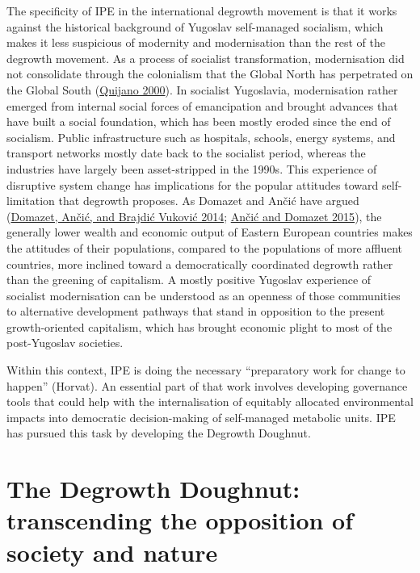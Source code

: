 \documentclass[a4paper, nobind]{templates/ociamthesis}
\begin{document}
The specificity of IPE in the international degrowth movement is that it works against the historical background of Yugoslav self-managed socialism, which makes it less suspicious of modernity and modernisation than the rest of the degrowth movement. As a process of socialist transformation, modernisation did not consolidate through the colonialism that the Global North has perpetrated on the Global South (\protect\hyperlink{ref-quijano_coloniality_2000}{Quijano 2000}). In socialist Yugoslavia, modernisation rather emerged from internal social forces of emancipation and brought advances that have built a social foundation, which has been mostly eroded since the end of socialism. Public infrastructure such as hospitals, schools, energy systems, and transport networks mostly date back to the socialist period, whereas the industries have largely been asset-stripped in the 1990s. This experience of disruptive system change has implications for the popular attitudes toward self-limitation that degrowth proposes. As Domazet and Ančić have argued (\protect\hyperlink{ref-domazet_prosperity_2014}{Domazet, Ančić, and Brajdić Vuković 2014}; \protect\hyperlink{ref-ancic_potential_2015}{Ančić and Domazet 2015}), the generally lower wealth and economic output of Eastern European countries makes the attitudes of their populations, compared to the populations of more affluent countries, more inclined toward a democratically coordinated degrowth rather than the greening of capitalism. A mostly positive Yugoslav experience of socialist modernisation can be understood as an openness of those communities to alternative development pathways that stand in opposition to the present growth-oriented capitalism, which has brought economic plight to most of the post-Yugoslav societies.

Within this context, IPE is doing the necessary ``preparatory work for change to happen'' (Horvat). An essential part of that work involves developing governance tools that could help with the internalisation of equitably allocated environmental impacts into democratic decision-making of self-managed metabolic units. IPE has pursued this task by developing the Degrowth Doughnut.

\hypertarget{the-degrowth-doughnut-transcending-the-opposition-of-society-and-nature}{%
\section{The Degrowth Doughnut: transcending the opposition of society and nature}\label{the-degrowth-doughnut-transcending-the-opposition-of-society-and-nature}}
\end{document}
